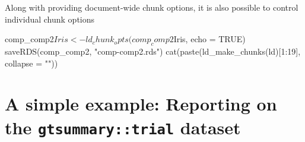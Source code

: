 Along with providing document-wide chunk options, it is also possible to
control individual chunk options

\begin{Schunk}
\begin{Sinput}
comp_comp2$Iris <- ld_chunk_opts(comp_comp2$Iris, echo = TRUE)
saveRDS(comp_comp2, "comp-comp2.rds")
cat(paste(ld_make_chunks(ld)[1:19], collapse = "\n"))
\end{Sinput}
\end{Schunk}

\hypertarget{a-simple-example-reporting-on-the-gtsummarytrial-dataset}{%
\section{\texorpdfstring{A simple example: Reporting on the
\texttt{gtsummary::trial}
dataset}{A simple example: Reporting on the gtsummary::trial dataset}}\label{a-simple-example-reporting-on-the-gtsummarytrial-dataset}}

\label{sect:simple-example}

